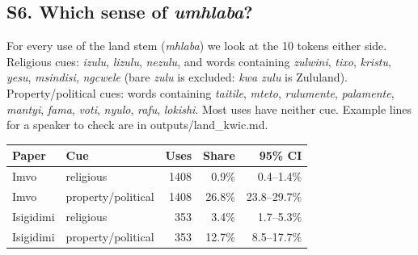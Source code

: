 \documentclass[10pt,letterpaper]{article}
\begin{document}
\subsection*{S6. Which sense of \emph{umhlaba}?}
For every use of the land stem (\emph{mhlaba}) we look at the 10 tokens either side. Religious cues: \emph{izulu}, \emph{lizulu}, \emph{nezulu}, and words containing \emph{zulwini}, \emph{tixo}, \emph{kristu}, \emph{yesu}, \emph{msindisi}, \emph{ngcwele} (bare \emph{zulu} is excluded: \emph{kwa zulu} is Zululand). Property/political cues: words containing \emph{taitile}, \emph{mteto}, \emph{rulumente}, \emph{palamente}, \emph{mantyi}, \emph{fama}, \emph{voti}, \emph{nyulo}, \emph{rafu}, \emph{lokishi}. Most uses have neither cue. Example lines for a speaker to check are in outputs/land\_kwic.md.\\[2pt]
\begin{tabular}{@{}llrrr@{}}
\toprule
Paper & Cue & Uses & Share & 95\% CI \\ \midrule
Imvo & religious & 1408 & 0.9\% & 0.4--1.4\% \\
Imvo & property/political & 1408 & 26.8\% & 23.8--29.7\% \\
Isigidimi & religious & 353 & 3.4\% & 1.7--5.3\% \\
Isigidimi & property/political & 353 & 12.7\% & 8.5--17.7\% \\
\bottomrule
\end{tabular}
\end{document}
